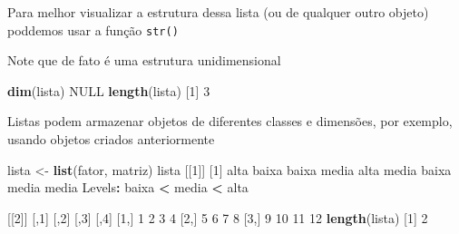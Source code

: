 \documentclass[10pt,a4paper]{book}
\newenvironment{Shaded}{\begin{snugshade}}{\end{snugshade}}
\newcommand{\KeywordTok}[1]{\textcolor[rgb]{0.13,0.29,0.53}{\textbf{#1}}}
\newcommand{\DecValTok}[1]{\textcolor[rgb]{0.00,0.00,0.81}{#1}}
\newcommand{\StringTok}[1]{\textcolor[rgb]{0.31,0.60,0.02}{#1}}
\newcommand{\OtherTok}[1]{\textcolor[rgb]{0.56,0.35,0.01}{#1}}
\newcommand{\OperatorTok}[1]{\textcolor[rgb]{0.81,0.36,0.00}{\textbf{#1}}}
\newcommand{\ErrorTok}[1]{\textcolor[rgb]{0.64,0.00,0.00}{\textbf{#1}}}
\newcommand{\NormalTok}[1]{#1}
\begin{document}
Para melhor visualizar a estrutura dessa lista (ou de qualquer outro
objeto) poddemos usar a função \texttt{str()}

\begin{Shaded}
\end{Shaded}

Note que de fato é uma estrutura unidimensional

\begin{Shaded}
\begin{Highlighting}[]
\KeywordTok{dim}\NormalTok{(lista)}
\OtherTok{NULL}
\KeywordTok{length}\NormalTok{(lista)}
\NormalTok{[}\DecValTok{1}\NormalTok{] }\DecValTok{3}
\end{Highlighting}
\end{Shaded}

Listas podem armazenar objetos de diferentes classes e dimensões, por
exemplo, usando objetos criados anteriormente

\begin{Shaded}
\begin{Highlighting}[]
\NormalTok{lista <-}\StringTok{ }\KeywordTok{list}\NormalTok{(fator, matriz)}
\NormalTok{lista}
\NormalTok{[[}\DecValTok{1}\NormalTok{]]}
\NormalTok{[}\DecValTok{1}\NormalTok{] alta  baixa baixa media alta  media baixa media media}
\NormalTok{Levels}\OperatorTok{:}\StringTok{ }\NormalTok{baixa }\OperatorTok{<}\StringTok{ }\NormalTok{media }\OperatorTok{<}\StringTok{ }\NormalTok{alta}

\NormalTok{[[}\DecValTok{2}\NormalTok{]]}
\NormalTok{     [,}\DecValTok{1}\NormalTok{] [,}\DecValTok{2}\NormalTok{] [,}\DecValTok{3}\NormalTok{] [,}\DecValTok{4}\NormalTok{]}
\NormalTok{[}\DecValTok{1}\NormalTok{,]    }\DecValTok{1}    \DecValTok{2}    \DecValTok{3}    \DecValTok{4}
\NormalTok{[}\DecValTok{2}\NormalTok{,]    }\DecValTok{5}    \DecValTok{6}    \DecValTok{7}    \DecValTok{8}
\NormalTok{[}\DecValTok{3}\NormalTok{,]    }\DecValTok{9}   \DecValTok{10}   \DecValTok{11}   \DecValTok{12}
\KeywordTok{length}\NormalTok{(lista)}
\NormalTok{[}\DecValTok{1}\NormalTok{] }\DecValTok{2}
\end{Highlighting}
\end{Shaded}
\end{document}
